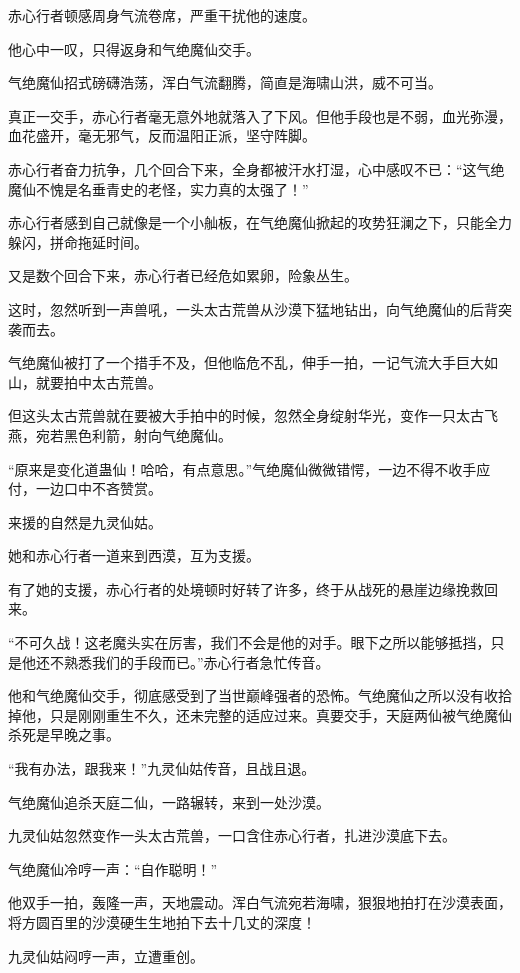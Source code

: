 \begin{this_body}
赤心行者顿感周身气流卷席，严重干扰他的速度。

他心中一叹，只得返身和气绝魔仙交手。

气绝魔仙招式磅礴浩荡，浑白气流翻腾，简直是海啸山洪，威不可当。

真正一交手，赤心行者毫无意外地就落入了下风。但他手段也是不弱，血光弥漫，血花盛开，毫无邪气，反而温阳正派，坚守阵脚。

赤心行者奋力抗争，几个回合下来，全身都被汗水打湿，心中感叹不已：“这气绝魔仙不愧是名垂青史的老怪，实力真的太强了！”

赤心行者感到自己就像是一个小舢板，在气绝魔仙掀起的攻势狂澜之下，只能全力躲闪，拼命拖延时间。

又是数个回合下来，赤心行者已经危如累卵，险象丛生。

这时，忽然听到一声兽吼，一头太古荒兽从沙漠下猛地钻出，向气绝魔仙的后背突袭而去。

气绝魔仙被打了一个措手不及，但他临危不乱，伸手一拍，一记气流大手巨大如山，就要拍中太古荒兽。

但这头太古荒兽就在要被大手拍中的时候，忽然全身绽射华光，变作一只太古飞燕，宛若黑色利箭，射向气绝魔仙。

“原来是变化道蛊仙！哈哈，有点意思。”气绝魔仙微微错愕，一边不得不收手应付，一边口中不吝赞赏。

来援的自然是九灵仙姑。

她和赤心行者一道来到西漠，互为支援。

有了她的支援，赤心行者的处境顿时好转了许多，终于从战死的悬崖边缘挽救回来。

“不可久战！这老魔头实在厉害，我们不会是他的对手。眼下之所以能够抵挡，只是他还不熟悉我们的手段而已。”赤心行者急忙传音。

他和气绝魔仙交手，彻底感受到了当世巅峰强者的恐怖。气绝魔仙之所以没有收拾掉他，只是刚刚重生不久，还未完整的适应过来。真要交手，天庭两仙被气绝魔仙杀死是早晚之事。

“我有办法，跟我来！”九灵仙姑传音，且战且退。

气绝魔仙追杀天庭二仙，一路辗转，来到一处沙漠。

九灵仙姑忽然变作一头太古荒兽，一口含住赤心行者，扎进沙漠底下去。

气绝魔仙冷哼一声：“自作聪明！”

他双手一拍，轰隆一声，天地震动。浑白气流宛若海啸，狠狠地拍打在沙漠表面，将方圆百里的沙漠硬生生地拍下去十几丈的深度！

九灵仙姑闷哼一声，立遭重创。


\end{this_body}
